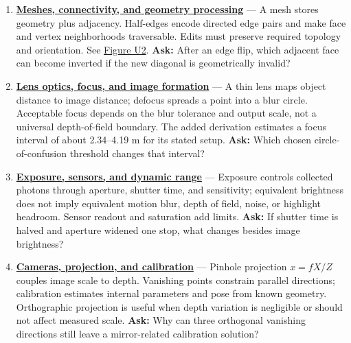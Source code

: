 \begin{enumerate}
\item
  \textbf{\href{Continuous\%20Notes/University\%20-\%20Worlds,\%20Images\%20and\%20Inference\%20-\%20Graphics,\%20Vision\%20and\%20Photography\#Meshes,\%20connectivity,\%20and\%20geometry\%20processing}{Meshes, connectivity, and geometry processing}} --- A mesh stores geometry plus adjacency. Half-edges encode directed edge pairs and make face and vertex neighborhoods traversable. Edits must preserve required topology and orientation. See \href{Continuous\%20Notes/University\%20-\%20Worlds,\%20Images\%20and\%20Inference\%20-\%20Graphics,\%20Vision\%20and\%20Photography\#Figure\%20U2\%20-\%20A\%20half-edge\%20separates\%20face\%20traversal\%20from\%20edge\%20traversal}{Figure U2}. \textbf{Ask:} After an edge flip, which adjacent face can become inverted if the new diagonal is geometrically invalid?
\item
  \textbf{\href{Continuous\%20Notes/University\%20-\%20Worlds,\%20Images\%20and\%20Inference\%20-\%20Graphics,\%20Vision\%20and\%20Photography\#Lens\%20optics,\%20focus,\%20and\%20image\%20formation}{Lens optics, focus, and image formation}} --- A thin lens maps object distance to image distance; defocus spreads a point into a blur circle. Acceptable focus depends on the blur tolerance and output scale, not a universal depth-of-field boundary. The added derivation estimates a focus interval of about 2.34--4.19 m for its stated setup. \textbf{Ask:} Which chosen circle-of-confusion threshold changes that interval?
\item
  \textbf{\href{Continuous\%20Notes/University\%20-\%20Worlds,\%20Images\%20and\%20Inference\%20-\%20Graphics,\%20Vision\%20and\%20Photography\#Exposure,\%20sensors,\%20and\%20dynamic\%20range}{Exposure, sensors, and dynamic range}} --- Exposure controls collected photons through aperture, shutter time, and sensitivity; equivalent brightness does not imply equivalent motion blur, depth of field, noise, or highlight headroom. Sensor readout and saturation add limits. \textbf{Ask:} If shutter time is halved and aperture widened one stop, what changes besides image brightness?
\item
  \textbf{\href{Continuous\%20Notes/University\%20-\%20Worlds,\%20Images\%20and\%20Inference\%20-\%20Graphics,\%20Vision\%20and\%20Photography\#Cameras,\%20projection,\%20and\%20calibration}{Cameras, projection, and calibration}} --- Pinhole projection \(x=fX/Z\) couples image scale to depth. Vanishing points constrain parallel directions; calibration estimates internal parameters and pose from known geometry. Orthographic projection is useful when depth variation is negligible or should not affect measured scale. \textbf{Ask:} Why can three orthogonal vanishing directions still leave a mirror-related calibration solution?

\end{enumerate}
